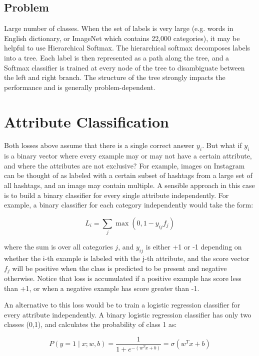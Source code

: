 \subsection*{Problem}

Large number of classes. When the set of labels is very large (e.g. words in English dictionary, or ImageNet which contains 22,000 categories), it may be helpful to use Hierarchical Softmax. The hierarchical softmax decomposes labels into a tree. Each label is then represented as a path along the tree, and a Softmax classifier is trained at every node of the tree to disambiguate between the left and right branch. The structure of the tree strongly impacts the performance and is generally problem-dependent.

\section*{Attribute Classification}
Both losses above assume that there is a single correct answer $y_i$. But what if $y_i$ is a binary vector where every example may or may not have a certain attribute, and where the attributes are not exclusive? For example, images on Instagram can be thought of as labeled with a certain subset of hashtags from a large set of all hashtags, and an image may contain multiple. A sensible approach in this case is to build a binary classifier for every single attribute independently. For example, a binary classifier for each category independently would take the form:

\begin{equation}
L_i = \sum_j \max(0, 1 - y_{ij} f_j)
\end{equation}

where the sum is over all categories $j$, and $y_{ij}$ is either +1 or -1 depending on whether the i-th example is labeled with the j-th attribute, and the score vector $f_j$ will be positive when the class is predicted to be present and negative otherwise. Notice that loss is accumulated if a positive example has score less than +1, or when a negative example has score greater than -1.

An alternative to this loss would be to train a logistic regression classifier for every attribute independently. A binary logistic regression classifier has only two classes (0,1), and calculates the probability of class 1 as:

\begin{equation}
P(y = 1 \mid x; w, b) = \frac{1}{1 + e^{-(w^Tx +b)}} = \sigma (w^Tx + b)
\end{equation}

